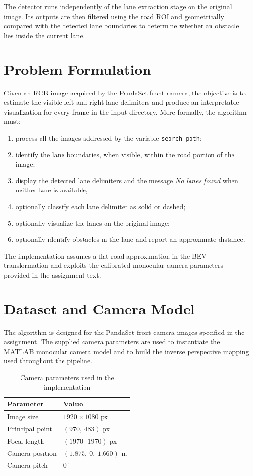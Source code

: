 \documentclass[conference]{IEEEtran}
\begin{document}
The detector runs independently of the lane extraction stage on the original image. Its outputs are then filtered using the road ROI and geometrically compared with the detected lane boundaries to determine whether an obstacle lies inside the current lane.

\section{Problem Formulation}
Given an RGB image acquired by the PandaSet front camera, the objective is to estimate the visible left and right lane delimiters and produce an interpretable visualization for every frame in the input directory. More formally, the algorithm must:
\begin{enumerate}
    \item process all the images addressed by the variable \texttt{search\_path};
    \item identify the lane boundaries, when visible, within the road portion of the image;
    \item display the detected lane delimiters and the message \textit{No lanes found} when neither lane is available;
    \item optionally classify each lane delimiter as solid or dashed;
    \item optionally visualize the lanes on the original image;
    \item optionally identify obstacles in the lane and report an approximate distance.
\end{enumerate}

The implementation assumes a flat-road approximation in the BEV transformation and exploits the calibrated monocular camera parameters provided in the assignment text.

\section{Dataset and Camera Model}
The algorithm is designed for the PandaSet front camera images specified in the assignment. The supplied camera parameters are used to instantiate the MATLAB monocular camera model and to build the inverse perspective mapping used throughout the pipeline.

\begin{table}[htbp]
\caption{Camera parameters used in the implementation}
\label{tab:camera}
\centering
\begin{tabular}{ll}
\toprule
Parameter & Value \\
\midrule
Image size & $1920 \times 1080$ px \\
Principal point & $(970,\ 483)$ px \\
Focal length & $(1970,\ 1970)$ px \\
Camera position & $(1.875,\ 0,\ 1.660)$ m \\
Camera pitch & $0^\circ$ \\
\bottomrule
\end{tabular}
\end{table}
\end{document}
